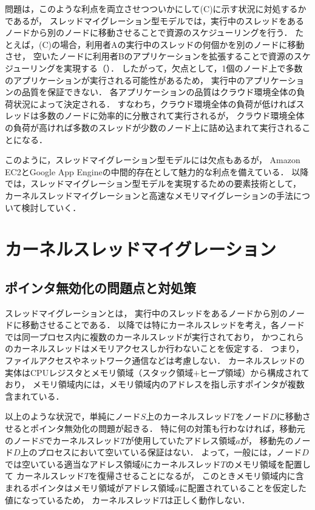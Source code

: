 \documentclass[10pt]{jsarticle}
\begin{document}
問題は，このような利点を両立させつついかにして(C)に示す状況に対処するかであるが，
スレッドマイグレーション型モデルでは，実行中のスレッドをあるノードから別のノードに移動させることで資源のスケジューリングを行う．
たとえば，(C)の場合，利用者Aの実行中のスレッドの何個かを別のノードに移動させ，
空いたノードに利用者Bのアプリケーションを拡張することで資源のスケジューリングを実現する（）．
したがって，欠点として，1個のノード上で多数のアプリケーションが実行される可能性があるため，
実行中のアプリケーションの品質を保証できない．
各アプリケーションの品質はクラウド環境全体の負荷状況によって決定される．
すなわち，クラウド環境全体の負荷が低ければスレッドは多数のノードに効率的に分散されて実行されるが，
クラウド環境全体の負荷が高ければ多数のスレッドが少数のノード上に詰め込まれて実行されることになる．

このように，スレッドマイグレーション型モデルには欠点もあるが，
Amazon EC2とGoogle App Engineの中間的存在として魅力的な利点を備えている．
以降では，スレッドマイグレーション型モデルを実現するための要素技術として，
カーネルスレッドマイグレーションと高速なメモリマイグレーションの手法について検討していく．

\section{カーネルスレッドマイグレーション}
\label{sec:thread}

\subsection{ポインタ無効化の問題点と対処策}

スレッドマイグレーション\cite{t4,t5,t6,t7,t8,t9}とは，
実行中のスレッドをあるノードから別のノードに移動させることである．
以降では特にカーネルスレッドを考え，各ノードでは同一プロセス内に複数のカーネルスレッドが実行されており，
かつこれらのカーネルスレッドはメモリアクセスしか行わないことを仮定する．
つまり，ファイルアクセスやネットワーク通信などは考慮しない．
カーネルスレッドの実体はCPUレジスタとメモリ領域（スタック領域$+$ヒープ領域）から構成されており，
メモリ領域内には，メモリ領域内のアドレスを指し示すポインタが複数含まれている．

以上のような状況で，単純にノード$S$上のカーネルスレッド$T$をノード$D$に移動させるとポインタ無効化の問題が起きる．
特に何の対策も行わなければ，移動元のノード$S$でカーネルスレッド$T$が使用していたアドレス領域$a$が，
移動先のノード$D$上のプロセスにおいて空いている保証はない．
よって，一般には，ノード$D$では空いている適当なアドレス領域$b$にカーネルスレッド$T$のメモリ領域を配置して
カーネルスレッド$T$を復帰させることになるが，
このときメモリ領域内に含まれるポインタはメモリ領域がアドレス領域$a$に配置されていることを仮定した値になっているため，
カーネルスレッド$T$は正しく動作しない\cite{t4,t5,t8,t9}．
\end{document}
